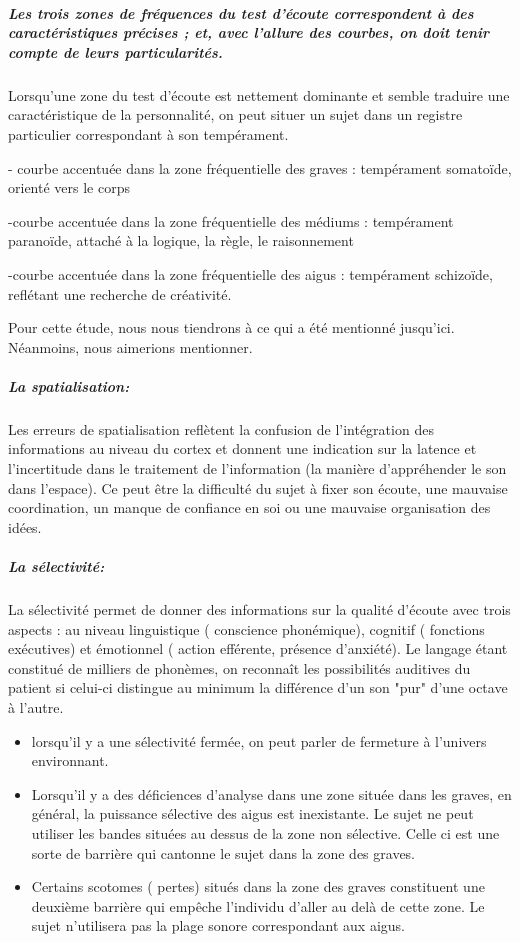 \subparagraph{Les trois zones de fréquences du test d'écoute correspondent à des
caractéristiques précises ; et, avec l'allure des courbes, on doit
tenir compte de leurs particularités.}

Lorsqu'une zone du test d'écoute est nettement dominante et semble
traduire une caractéristique de la personnalité, on peut situer un
sujet dans un registre particulier correspondant à son tempérament.

- courbe accentuée dans la zone fréquentielle des graves : tempérament
somatoïde, orienté vers le corps

-courbe accentuée dans la zone fréquentielle des médiums : tempérament
paranoïde, attaché à la logique, la règle, le raisonnement 

-courbe accentuée dans la zone fréquentielle des aigus : tempérament
schizoïde, reflétant une recherche de créativité. 


Pour cette étude, nous nous tiendrons à ce qui a été mentionné jusqu'ici.   
Néanmoins, nous aimerions  mentionner.

\subparagraph{La spatialisation: }


Les erreurs de spatialisation reflètent la confusion
de l'intégration des informations au niveau du cortex et donnent une indication sur la latence et l'incertitude
dans le traitement de l'information (la manière d'appréhender le
son dans l'espace). Ce peut être la difficulté du sujet à fixer son
écoute, une mauvaise coordination, un manque de confiance en soi ou
une mauvaise organisation des idées.

\subparagraph{La sélectivité: }


La sélectivité permet de donner des informations sur la
qualité d'écoute avec trois aspects : au niveau linguistique ( conscience
phonémique), cognitif ( fonctions exécutives) et émotionnel ( action
efférente, présence d'anxiété).
Le langage étant constitué de milliers de phonèmes, on reconnaît les possibilités auditives du patient si celui-ci  distingue au minimum la différence d'un son "pur" d'une octave à l'autre.  

\begin{itemize}
\item lorsqu'il y a une sélectivité fermée, on peut parler de fermeture
à l'univers environnant.
\item Lorsqu'il y a des déficiences d'analyse dans une zone située dans
les graves, en général, la puissance sélective des aigus est inexistante.
Le sujet ne peut utiliser les bandes situées au dessus de la zone
non sélective. Celle ci est une sorte de barrière qui cantonne le
sujet dans la zone des graves. 
\item Certains scotomes ( pertes) situés dans la zone des graves constituent
une deuxième barrière qui empêche l'individu d'aller au delà de cette
zone. Le sujet n'utilisera pas la plage sonore correspondant aux aigus. 
\end{itemize}



